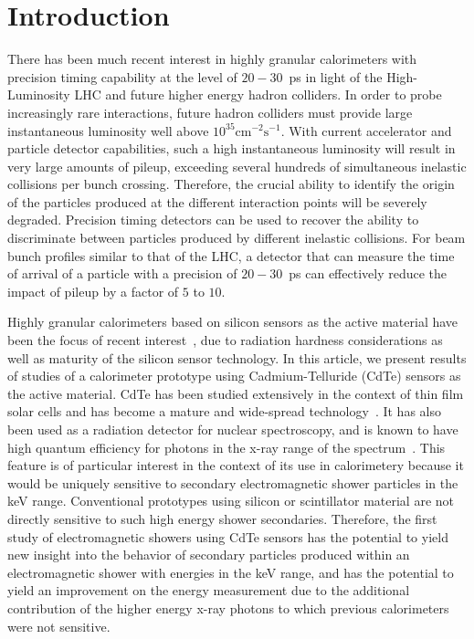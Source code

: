 \section{Introduction} 

There has been much recent interest in highly granular calorimeters with 
precision timing capability at the level of $20-30$~ps in light of the High-Luminosity
LHC and future higher energy hadron colliders. In order to probe increasingly
rare interactions, future hadron colliders must provide large 
instantaneous luminosity well above $10^{35}\mathrm{cm}^{-2}\mathrm{s}^{-1}$.
With current accelerator and particle detector capabilities, such a high 
instantaneous luminosity will result in very large amounts
of pileup, exceeding several hundreds of simultaneous inelastic collisions per
bunch crossing. Therefore, the crucial ability to identify the origin 
of the particles produced at the different interaction points will be severely 
degraded. Precision timing detectors can be used to recover the ability to 
discriminate between particles produced by different inelastic collisions.
For beam bunch profiles similar to that of the LHC, a detector 
that can measure the time of arrival of a particle
with a precision of $20-30$~ps can effectively reduce the impact of
pileup by a factor of $5$ to $10$. 

Highly granular calorimeters based on silicon sensors as the active material 
have been the focus of recent interest~\cite{Adloff:2009,Butler:2020886}, due to
radiation hardness considerations as well as maturity of the silicon sensor
technology. In this article, we present results of studies of a 
calorimeter prototype using Cadmium-Telluride (CdTe) sensors as the 
active material. CdTe has been studied extensively in the context
of thin film solar cells and has become a mature and wide-spread
technology~\cite{CdTeSolar}. It has also been used as a radiation
detector for nuclear spectroscopy, and is known to have high
quantum efficiency for photons in the x-ray range of the spectrum~\cite{CdTeQE}.
This feature is of particular interest in the context of its use
in calorimetery because it would be uniquely sensitive to secondary
electromagnetic shower particles in the keV range. Conventional prototypes 
using silicon or scintillator material are not directly sensitive to such high 
energy shower secondaries. Therefore, the first study of electromagnetic
showers using CdTe sensors has the potential to yield new insight
into the behavior of secondary particles produced within an 
electromagnetic shower with energies in the keV range, and has the potential
to yield an improvement on the energy measurement due to
the additional contribution of the higher energy x-ray photons to which previous
calorimeters were not sensitive.

